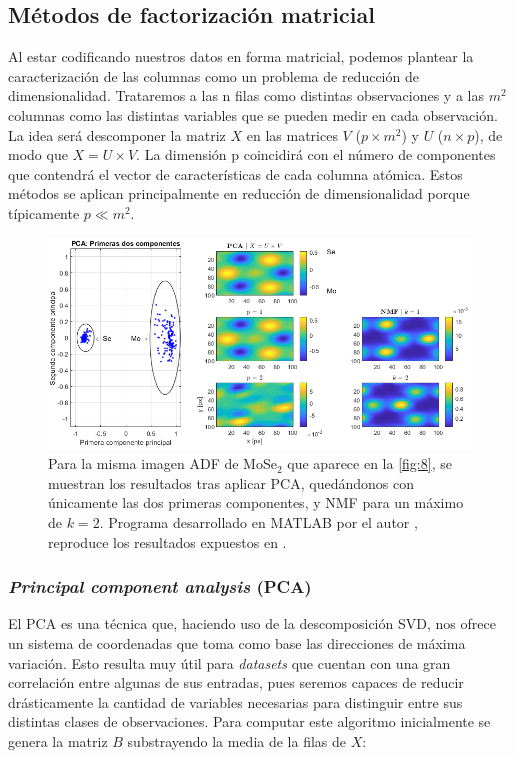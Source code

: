 \newpage
\subsection{Métodos de factorización matricial}

Al estar codificando nuestros datos en forma matricial, podemos plantear la caracterización de las columnas como un problema de reducción de dimensionalidad. Trataremos a las n filas como distintas observaciones y a las $m^2$ columnas como las distintas variables que se pueden medir en cada observación.\\

La idea será descomponer la matriz $X$ en las matrices $V$ ($p \times m^2$) y $U$ ($n \times p$), de modo que $X = U \times V$. La dimensión p coincidirá con el número de componentes que contendrá el vector de características de cada columna atómica. Estos métodos se aplican principalmente en reducción de dimensionalidad porque típicamente $p \ll m^2$.

\begin{figure}[h!]
    \centering
    \includegraphics[width=1\textwidth]{fig/Fig9.png}
    \caption{Para la misma imagen ADF de MoSe$_2$ que aparece en la \autoref{fig:8}, se muestran los resultados tras aplicar PCA, quedándonos con únicamente las dos primeras componentes, y NMF para un máximo de $k = 2$. Programa desarrollado en MATLAB por el autor \cite{repo}, reproduce los resultados expuestos en \cite{ml}.}
    \label{fig:9}
\end{figure}

\vspace{-0.5cm}
\subsubsection{\textit{Principal component analysis} (PCA)}
El PCA es una técnica que, haciendo uso de la descomposición SVD, nos ofrece un sistema de coordenadas que toma como base las direcciones de máxima variación. Esto resulta muy útil para \textit{datasets} que cuentan con una gran correlación entre algunas de sus entradas, pues seremos capaces de reducir drásticamente la cantidad de variables necesarias para distinguir entre sus distintas clases de observaciones. Para computar este algoritmo inicialmente se genera la matriz $B$ substrayendo la media de la filas de $X$:

